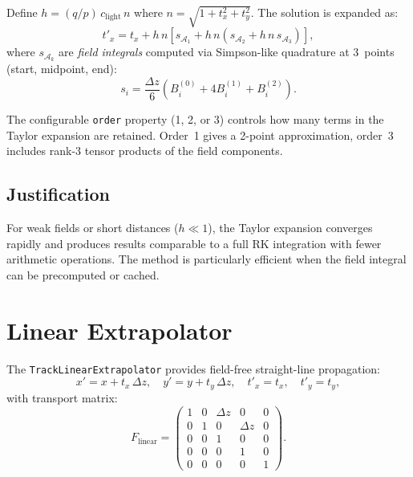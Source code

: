 \documentclass[11pt,a4paper]{article}
\newcommand{\dz}{\Delta z}
\newcommand{\qop}{q/p}
\newcommand{\clgt}{c_\text{light}}
\begin{document}
Define $h = (\qop)\,\clgt\,n$ where $n = \sqrt{1+t_x^2+t_y^2}$. The solution
is expanded as:
\begin{equation}
  t'_x = t_x + h\,n\left[s_{\mathcal{A}_1} + h\,n\left(s_{\mathcal{A}_2} + h\,n\,s_{\mathcal{A}_3}\right)\right],
\end{equation}
where $s_{\mathcal{A}_k}$ are \textit{field integrals} computed via
Simpson-like quadrature at 3~points (start, midpoint, end):
\begin{equation}
  s_i = \frac{\dz}{6}(B_i^{(0)} + 4 B_i^{(1)} + B_i^{(2)}).
\end{equation}

The configurable \texttt{order} property (1, 2, or 3) controls how many terms
in the Taylor expansion are retained. Order~1 gives a 2-point approximation,
order~3 includes rank-3 tensor products of the field components.

\subsection{Justification}

For weak fields or short distances ($h \ll 1$), the Taylor expansion converges
rapidly and produces results comparable to a full RK integration with fewer
arithmetic operations. The method is particularly efficient when the field
integral can be precomputed or cached.


\section{Linear Extrapolator}\label{sec:linear}

The \texttt{TrackLinearExtrapolator} provides field-free straight-line
propagation:
\begin{equation}
  x' = x + t_x\,\dz, \quad y' = y + t_y\,\dz, \quad t'_x = t_x, \quad t'_y = t_y,
\end{equation}
with transport matrix:
\begin{equation}
  F_\text{linear} =
  \begin{pmatrix}
    1 & 0 & \dz & 0   & 0 \\
    0 & 1 & 0   & \dz & 0 \\
    0 & 0 & 1   & 0   & 0 \\
    0 & 0 & 0   & 1   & 0 \\
    0 & 0 & 0   & 0   & 1
  \end{pmatrix}.
\end{equation}
\end{document}
